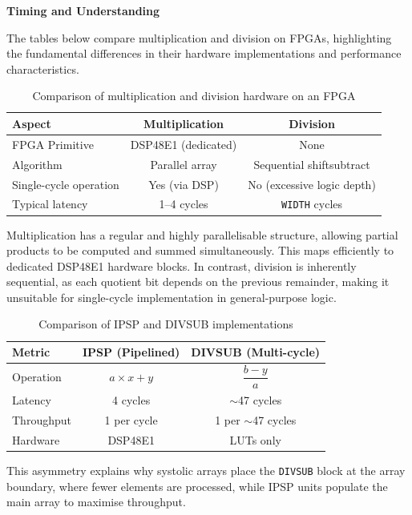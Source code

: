 \documentclass[a4paper,12pt]{article}
\begin{document}
\textbf{Timing and Understanding}

The tables below compare multiplication and division on FPGAs, highlighting the fundamental differences in their hardware implementations and performance characteristics.

\begin{table}[h]
\centering
\begin{tabular}{l c c}
\hline
\textbf{Aspect} & \textbf{Multiplication} & \textbf{Division} \\
\hline
FPGA Primitive & DSP48E1 (dedicated) & None \\
Algorithm & Parallel array & Sequential shift\-subtract \\
Single-cycle operation & Yes (via DSP) & No (excessive logic depth) \\
Typical latency & 1--4 cycles & \texttt{WIDTH} cycles \\
\hline
\end{tabular}
\caption{Comparison of multiplication and division hardware on an FPGA}
\end{table}

Multiplication has a regular and highly parallelisable structure, allowing partial products to be computed and summed simultaneously. This maps efficiently to dedicated DSP48E1 hardware blocks. In contrast, division is inherently sequential, as each quotient bit depends on the previous remainder, making it unsuitable for single-cycle implementation in general-purpose logic.

\begin{table}[h]
\centering
\begin{tabular}{l c c}
\hline
\textbf{Metric} & \textbf{IPSP (Pipelined)} & \textbf{DIVSUB (Multi-cycle)} \\
\hline
Operation & $a \times x + y$ & $\dfrac{b - y}{a}$ \\
Latency & 4 cycles & $\sim$47 cycles \\
Throughput & 1 per cycle & 1 per $\sim$47 cycles \\
Hardware & DSP48E1 & LUTs only \\
\hline
\end{tabular}
\caption{Comparison of IPSP and DIVSUB implementations}
\end{table}

This asymmetry explains why systolic arrays place the \texttt{DIVSUB} block at the array boundary, where fewer elements are processed, while IPSP units populate the main array to maximise throughput.
\end{document}
